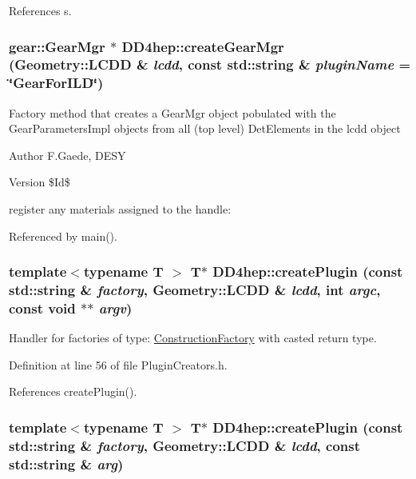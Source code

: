 References s.\hypertarget{namespace_d_d4hep_aeaa49904e5fff3d47fa8fd9600655f3e}{
\subsubsection[{createGearMgr}]{\setlength{\rightskip}{0pt plus 5cm}gear::GearMgr $\ast$ DD4hep::createGearMgr (Geometry::LCDD \& {\em lcdd}, \/  const std::string \& {\em pluginName} = {\ttfamily \char`\"{}GearForILD\char`\"{}})}}
\label{namespace_d_d4hep_aeaa49904e5fff3d47fa8fd9600655f3e}
Factory method that creates a GearMgr object pobulated with the GearParametersImpl objects from all (top level) DetElements in the lcdd object \begin{DoxyAuthor}{Author}
F.Gaede, DESY 
\end{DoxyAuthor}
\begin{DoxyVersion}{Version}
\$Id\$ 
\end{DoxyVersion}


register any materials assigned to the handle: 

Referenced by main().\hypertarget{namespace_d_d4hep_a1b6cb9d68377ac85f56bdc813f4d5a44}{
\subsubsection[{createPlugin}]{\setlength{\rightskip}{0pt plus 5cm}template$<$typename T $>$ {\bf T}$\ast$ DD4hep::createPlugin (const std::string \& {\em factory}, \/  Geometry::LCDD \& {\em lcdd}, \/  int {\em argc}, \/  const void $\ast$$\ast$ {\em argv})}}
\label{namespace_d_d4hep_a1b6cb9d68377ac85f56bdc813f4d5a44}


Handler for factories of type: \hyperlink{class_d_d4hep_1_1_construction_factory}{ConstructionFactory} with casted return type. 

Definition at line 56 of file PluginCreators.h.

References createPlugin().\hypertarget{namespace_d_d4hep_ab186ae53516638d9e754c24b7c813262}{
\subsubsection[{createPlugin}]{\setlength{\rightskip}{0pt plus 5cm}template$<$typename T $>$ {\bf T}$\ast$ DD4hep::createPlugin (const std::string \& {\em factory}, \/  Geometry::LCDD \& {\em lcdd}, \/  const std::string \& {\em arg})}}
\label{namespace_d_d4hep_ab186ae53516638d9e754c24b7c813262}


